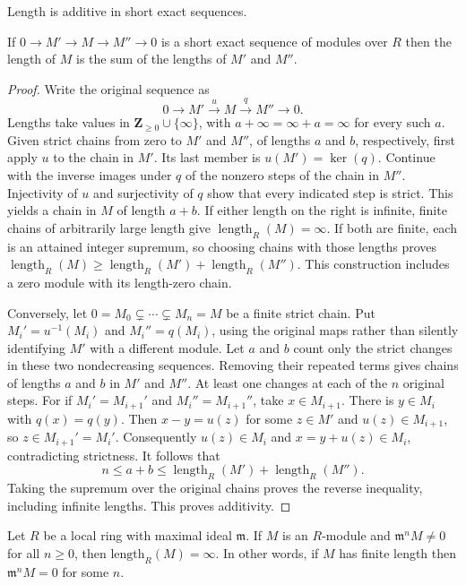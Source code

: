 \begin{lemma}
\label{lemma-length-additive}
\begin{slogan}
Length is additive in short exact sequences.
\end{slogan}
If $0 \to M' \to M \to M'' \to 0$
is a short exact sequence of modules over $R$ then
the length of $M$ is the sum of the
lengths of $M'$ and $M''$.
\end{lemma}

\begin{proof}
Write the original sequence as
$$
0\longrightarrow M'\xrightarrow{u}M\xrightarrow{q}M''
\longrightarrow0.
$$
Lengths take values in $\mathbf Z_{\geq0}\cup\{\infty\}$,
with $a+\infty=\infty+a=\infty$ for every such $a$.
Given strict chains from zero to $M'$ and $M''$, of lengths
$a$ and $b$, respectively, first apply $u$ to the chain in
$M'$. Its last member is $u(M')=\ker(q)$.
Continue with the inverse images under $q$ of the nonzero steps
of the chain in $M''$. Injectivity of $u$ and surjectivity of
$q$ show that every indicated step is strict. This yields a
chain in $M$ of length $a+b$. If either length on the right is
infinite, finite chains of arbitrarily large length give
$\operatorname{length}_R(M)=\infty$. If both are finite, each
is an attained integer supremum, so choosing chains with those
lengths proves
$\operatorname{length}_R(M)\geq
\operatorname{length}_R(M')+\operatorname{length}_R(M'')$.
This construction includes a zero module with its length-zero chain.

Conversely, let $0=M_0\subsetneq\cdots\subsetneq M_n=M$
be a finite strict chain. Put
$M_i'=u^{-1}(M_i)$ and $M_i''=q(M_i)$, using the original
maps rather than silently identifying $M'$ with a different module.
Let $a$ and $b$ count only the strict changes in these two
nondecreasing sequences. Removing their repeated terms gives
chains of lengths $a$ and $b$ in $M'$ and $M''$.
At least one changes at each of the $n$ original steps.
For if $M_i'=M_{i+1}'$ and $M_i''=M_{i+1}''$, take
$x\in M_{i+1}$. There is $y\in M_i$ with $q(x)=q(y)$.
Then $x-y=u(z)$ for some $z\in M'$ and
$u(z)\in M_{i+1}$, so $z\in M_{i+1}'=M_i'$.
Consequently $u(z)\in M_i$ and $x=y+u(z)\in M_i$,
contradicting strictness. It follows that
$$
n\leq a+b\leq
\operatorname{length}_R(M')+\operatorname{length}_R(M'').
$$
Taking the supremum over the original chains proves the reverse
inequality, including infinite lengths. This proves additivity.
\end{proof}

\begin{lemma}
\label{lemma-length-infinite}
Let $R$ be a local ring with maximal ideal $\mathfrak m$.
If $M$ is an $R$-module and $\mathfrak m^n M \not = 0$ for all $n \geq 0$,
then $\text{length}_R(M) = \infty$. In other words, if $M$
has finite length then $\mathfrak m^nM = 0$ for some $n$.
\end{lemma}

